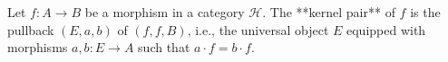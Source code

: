 Let $f: A \longrightarrow B$ be a morphism in a category $\mathcal{H}$. The **kernel pair** of $f$ is the pullback $(E, a, b)$ of $(f, f, B)$, i.e., the universal object $E$ equipped with morphisms $a, b: E \longrightarrow A$ such that $a \cdot f = b \cdot f$.
